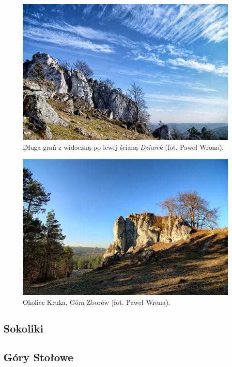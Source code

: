 \documentclass{article}
\begin{document}
\begin{figure}[!htbp]
	\begin{center}
		\includegraphics[width=0.9\linewidth]{images/jura-gora-zborow.eps}
	\end{center}
	\caption{Długa grań z widoczną po lewej ścianą \textit{Dziurek} (fot. Paweł Wrona)\cite{jura-gora-zborow}.}
	\label{zborow}
\end{figure}

\begin{figure}[!htbp]
	\begin{center}
		\includegraphics[width=0.9\linewidth]{images/jura-gora-zborow-2.eps}
	\end{center}
	\caption{Okolice Kruka, Góra Zborów (fot. Paweł Wrona)\cite{jura-gora-zborow}.}
	\label{}
\end{figure}

\subsection{Sokoliki}

\subsection{Góry Stołowe}

\nocite{*}
\printbibliography
\end{document}
